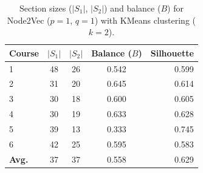 \begin{table}[t]
\centering
\caption{Section sizes ($|S_1|$, $|S_2|$) and balance ($B$) for Node2Vec ($p{=}1$, $q{=}1$) with KMeans clustering ($k{=}2$).}
\label{tab:section_balance_detail}
\begin{tabular}{lcccr}
\toprule
\textbf{Course} & $|S_1|$ & $|S_2|$ & \textbf{Balance} ($B$) & \textbf{Silhouette} \\
\midrule
1 & 48 & 26 & 0.542 & 0.599 \\
2 & 31 & 20 & 0.645 & 0.614 \\
3 & 30 & 18 & 0.600 & 0.605 \\
4 & 30 & 19 & 0.633 & 0.628 \\
5 & 39 & 13 & 0.333 & 0.745 \\
6 & 42 & 25 & 0.595 & 0.583 \\
\textbf{Avg.} & 37 & 37 & 0.558 & 0.629 \\
\bottomrule
\end{tabular}
\end{table}